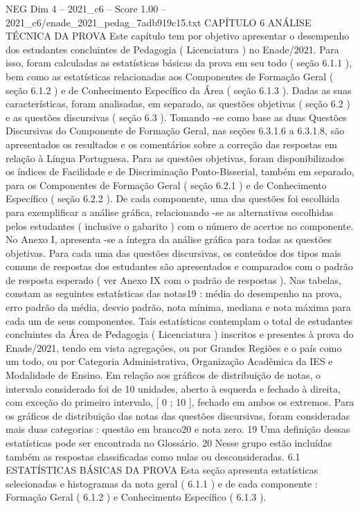 \begin{textsample}{NEG Dim 4 – 2021\_c6 – Score 1.00 – 2021\_c6/enade\_2021\_pedag\_7adb919c15.txt}  \label{ex:f4_neg_293}
CAPÍTULO 6 ANÁLISE TÉCNICA DA PROVA Este capítulo tem por objetivo apresentar o desempenho dos estudantes concluintes de Pedagogia ( Licenciatura ) no Enade/2021.
Para isso, foram calculadas as estatísticas básicas da prova em seu todo ( seção 6.1.1 ), bem como as estatísticas relacionadas aos Componentes de Formação Geral ( seção 6.1.2 ) e de Conhecimento Específico da Área ( seção 6.1.3 ).
Dadas as suas características, foram analisadas, em separado, as questões objetivas ( seção 6.2 ) e as questões discursivas ( seção 6.3 ).
Tomando -se como base as duas Questões Discursivas do Componente de Formação Geral, nas seções 6.3.1.6 a 6.3.1.8, são apresentados os resultados e os comentários sobre a correção das respostas em relação à Língua Portuguesa.
Para as questões objetivas, foram disponibilizados os índices de Facilidade e de Discriminação Ponto-Bisserial, também em separado, para os Componentes de Formação Geral ( seção 6.2.1 ) e de Conhecimento Específico ( seção 6.2.2 ).
De cada componente, uma das questões foi escolhida para exemplificar a análise gráfica, relacionando -se as alternativas escolhidas pelos estudantes ( inclusive o gabarito ) com o número de acertos no componente.
No Anexo I, apresenta -se a íntegra da análise gráfica para todas as questões objetivas.
Para cada uma das questões discursivas, os conteúdos dos tipos mais comuns de respostas dos estudantes são apresentados e comparados com o padrão de resposta esperado ( ver Anexo IX com o padrão de respostas ).
Nas tabelas, constam as seguintes estatísticas das notas19 : média do desempenho na prova, erro padrão da média, desvio padrão, nota mínima, mediana e nota máxima para cada um de seus componentes.
Tais estatísticas contemplam o total de estudantes concluintes da Área de Pedagogia ( Licenciatura ) inscritos e presentes à prova do Enade/2021, tendo em vista agregações, ou por Grandes Regiões e o país como um todo, ou por Categoria Administrativa, Organização Acadêmica da IES e Modalidade de Ensino.
Em relação aos gráficos de distribuição de notas, o intervalo considerado foi de 10 unidades, aberto à esquerda e fechado à direita, com exceção do primeiro intervalo, [ 0 ; 10 ], fechado em ambos os extremos.
Para os gráficos de distribuição das notas das questões discursivas, foram consideradas mais duas categorias : questão em branco20 e nota zero. 19 Uma definição dessas estatísticas pode ser encontrada no Glossário. 20 Nesse grupo estão incluídas também as respostas classificadas como nulas ou desconsideradas. 6.1 ESTATÍSTICAS BÁSICAS DA PROVA Esta seção apresenta estatísticas selecionadas e histogramas da nota geral ( 6.1.1 ) e de cada componente : Formação Geral ( 6.1.2 ) e Conhecimento Específico ( 6.1.3 ).

\end{textsample}
